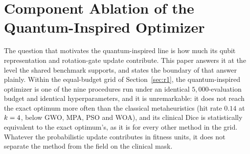 %
\section{Component Ablation of the Quantum-Inspired Optimizer}
\label{sec:r3}

The question that motivates the quantum-inspired line is how much its qubit
representation and rotation-gate update contribute. This paper answers it at the
level the shared benchmark supports, and states the boundary of that answer
plainly. Within the equal-budget grid of Section~\ref{sec:r1}, the
quantum-inspired optimizer is one of the nine procedures run under an identical
$5{,}000$-evaluation budget and identical hyperparameters, and it is unremarkable:
it does not reach the exact optimum more often than the classical metaheuristics
(hit rate $0.14$ at $k=4$, below GWO, MPA, PSO and WOA), and its clinical
Dice is statistically equivalent to the exact optimum's, as it is for every other
method in the grid. Whatever the probabilistic update contributes in fitness
units, it does not separate the method from the field on the clinical mask.

